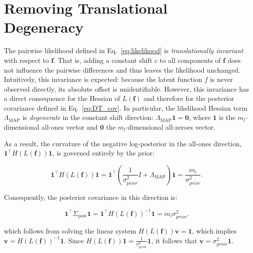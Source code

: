 \documentclass{article}
\begin{document}
\section{Removing Translational Degeneracy}\label{sec:translational_invariance}

The pairwise likelihood defined in Eq.~\ref{eq:likelihood} is \emph{translationally invariant} with respect to \(\mathbf{f}\). That is, adding a constant shift \(c\) to all components of \(\mathbf{f}\) does not influence the pairwise differences and thus leaves the likelihood unchanged. Intuitively, this invariance is expected: because the latent function \(f\) is never observed directly, its absolute offset is unidentifiable. However, this invariance has a direct consequence for the Hessian of \(L(\mathbf{f})\) and therefore for the posterior covariance defined in Eq.~\ref{eq:DT_cov}. In particular, the likelihood Hessian term \(\Lambda_{\text{MAP}}\) is \emph{degenerate} in the constant shift direction: $\Lambda_{\text{MAP}} \mathbf{1} = \mathbf{0}$, where $\mathbf{1}$ is the $m_l$-dimensional all-ones vector and $\mathbf{0}$ the $m_l$-dimensional all-zeroes vector.

As a result, the curvature of the negative log-posterior in the all-ones direction, \(\mathbf{1}^\top H(L(\mathbf{f})) \mathbf{1}\), is governed entirely by the prior:

\begin{equation*}
    \mathbf{1}^\top H(L(\mathbf{f})) \mathbf{1} = \mathbf{1}^\top \left( \frac{1}{\sigma_{prior}^2} I + \Lambda_{\text{MAP}} \right) \mathbf{1} = \frac{m_l}{\sigma_{prior}^2}.
\end{equation*}

Consequently, the posterior covariance in this direction is:

\begin{equation}\label{eq:simplified_cov}
    \mathbf{1}^\top \Sigma_{\text{post}} \mathbf{1} = \mathbf{1}^\top H(L(\mathbf{f}))^{-1} \mathbf{1} = m_l \sigma_{prior}^2.
\end{equation}

which follows from solving the linear system \(H(L(\mathbf{f})) \mathbf{v} = \mathbf{1}\), which implies \(\mathbf{v} = H(L(\mathbf{f}))^{-1} \mathbf{1}\). Since \(H(L(\mathbf{f})) \mathbf{1} = \frac{1}{\sigma_{prior}^2} \mathbf{1}\), it follows that \(\mathbf{v} = \sigma_{prior}^2 \mathbf{1}\).
\end{document}
